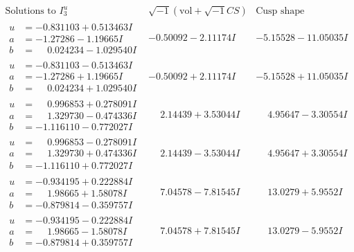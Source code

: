 \documentclass[1p]{elsarticle_modified}
\theoremstyle{definition}
\newcommand{\I}{\sqrt{-1}}
\begin{document}
$$\begin{array}{c|c|c}  
\text{Solutions to }I^u_{3}& \I (\text{vol} + \sqrt{-1}CS) & \text{Cusp shape}\\
 \hline 
\begin{aligned}
u &= -0.831103 + 0.513463 I \\
a &= -1.27286 - 1.19665 I \\
b &= \phantom{-}0.024234 - 1.029540 I\end{aligned}
 & -0.50092 - 2.11174 I & -5.15528 - 11.05035 I \\ \hline\begin{aligned}
u &= -0.831103 - 0.513463 I \\
a &= -1.27286 + 1.19665 I \\
b &= \phantom{-}0.024234 + 1.029540 I\end{aligned}
 & -0.50092 + 2.11174 I & -5.15528 + 11.05035 I \\ \hline\begin{aligned}
u &= \phantom{-}0.996853 + 0.278091 I \\
a &= \phantom{-}1.329730 - 0.474336 I \\
b &= -1.116110 - 0.772027 I\end{aligned}
 & \phantom{-}2.14439 + 3.53044 I & \phantom{-}4.95647 - 3.30554 I \\ \hline\begin{aligned}
u &= \phantom{-}0.996853 - 0.278091 I \\
a &= \phantom{-}1.329730 + 0.474336 I \\
b &= -1.116110 + 0.772027 I\end{aligned}
 & \phantom{-}2.14439 - 3.53044 I & \phantom{-}4.95647 + 3.30554 I \\ \hline\begin{aligned}
u &= -0.934195 + 0.222884 I \\
a &= \phantom{-}1.98665 + 1.58078 I \\
b &= -0.879814 - 0.359757 I\end{aligned}
 & \phantom{-}7.04578 - 7.81545 I & \phantom{-}13.0279 + 5.9552 I \\ \hline\begin{aligned}
u &= -0.934195 - 0.222884 I \\
a &= \phantom{-}1.98665 - 1.58078 I \\
b &= -0.879814 + 0.359757 I\end{aligned}
 & \phantom{-}7.04578 + 7.81545 I & \phantom{-}13.0279 - 5.9552 I \\ \hline\begin{aligned}

\end{aligned}
\end{array}$$
\end{document}
